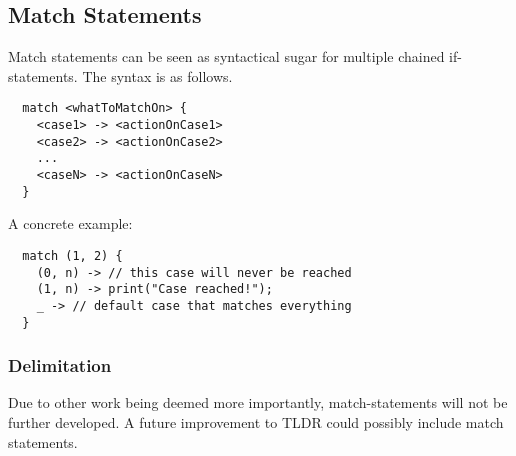 \subsection{Match Statements}
\label{subsec:matchStatements}

Match statements can be seen as syntactical sugar for multiple chained if-statements. The syntax is as follows.

\begin{verbatim}
  match <whatToMatchOn> {
    <case1> -> <actionOnCase1>
    <case2> -> <actionOnCase2>
    ...
    <caseN> -> <actionOnCaseN>
  }
\end{verbatim}

A concrete example:

\begin{verbatim}
  match (1, 2) {
    (0, n) -> // this case will never be reached
    (1, n) -> print("Case reached!");
    _ -> // default case that matches everything
  }
\end{verbatim}

\subsubsection{Delimitation}

Due to other work being deemed more importantly, match-statements will not be further developed. A future improvement to TLDR could possibly include match statements.
